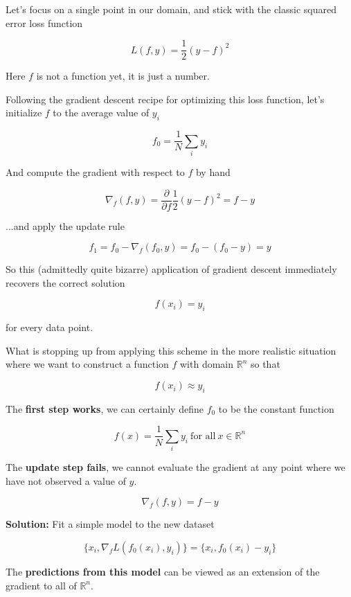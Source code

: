 %
\begin{frame}
Let's focus on a single point in our domain, and stick with the classic squared error loss function

$$ L(f, y) = \frac{1}{2} (y - f)^2 $$

Here $f$ is not a function yet, it is just a number.
\end{frame}
%
\begin{frame}
Following the gradient descent recipe for optimizing this loss function, let's initialize $f$ to the average value of $y_i$

$$ f_0 = \frac{1}{N} \sum_i y_i $$
\end{frame}
%
\begin{frame}
And compute the gradient with respect to $f$ by hand

$$ \nabla_{f} (f, y) = \frac{\partial}{\partial f} \frac{1}{2} (y - f)^2 = f - y $$
\end{frame}
%
\begin{frame}
...and apply the update rule

$$ f_1 = f_0 - \nabla_{f} (f_0, y) = f_0 - (f_0 - y) = y $$

So this (admittedly quite bizarre) application of gradient descent immediately recovers the correct solution

$$ f(x_i) = y_i $$

for every data point.
\end{frame}
%
\begin{frame}
\begin{center}
 What is stopping up from applying this scheme in the more realistic situation where we want to construct a function $f$ with domain $\mathbb{R}^n$ so that
\end{center}

$$ f(x_i) \approx y_i $$
\end{frame}
%
\begin{frame}
The \textbf{first step works}, we can certainly define $f_0$ to be the constant function

$$ f(x) = \frac{1}{N} \sum_i y_i \ \text{for all} \ x \in \mathbb{R}^n $$
\end{frame}
%
\begin{frame}
The \textbf{update step fails}, we cannot evaluate the gradient at any point where we have not observed a value of $y$.

$$ \nabla_f (f, y) = f - y $$
\end{frame}
%
\begin{frame}
\textbf{Solution:} Fit a simple model to the new dataset

$$ \{x_i, \nabla_f L(f_0(x_i), y_i) \} = \{x_i, f_0(x_i) - y_i \} $$

The \textbf{predictions from this model} can be viewed as an extension of the gradient to all of $\mathbb{R}^n$.
\end{frame}
